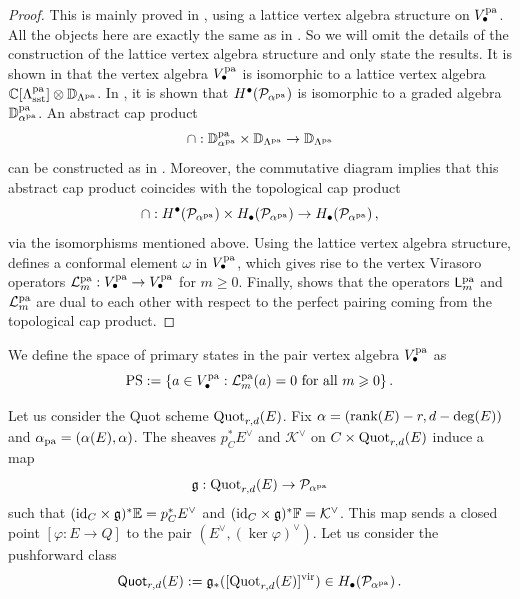 \documentclass[11pt]{amsart}
\theoremstyle{remark}
\newcommand{\C}{\mathbb{C}}
\renewcommand{\P}{\mathcal{P}}
\newcommand{\mf}[1]{\mathfrak{#1}}
\newcommand{\F}{\mathbb{F}}
\newcommand{\D}{\mathbb{D}}
\newcommand{\E}{\mathbb{E}}
\newcommand{\rk}{\textnormal{rank}}
\newcommand{\id}{\textup{id}}
\newcommand{\vp}[0]{\varphi}
\newcommand{\quot}[0]{\textnormal{Quot}}
\newcommand{\vir}[0]{\textnormal{vir}}
\newcommand{\pa}[0]{\textnormal{pa}}
\renewcommand{\L}[0]{\mathcal L}
\newcommand{\PS}{\textnormal{PS}}
\newcommand{\kv}{{\mathcal K^\vee}}
\newcommand{\mL}{\mathsf{L}}
\numberwithin{theorem}{section}
\begin{document}
\begin{proof}
This is mainly proved in \cite[Section 4.3]{BLM24},
using a lattice vertex algebra structure on $V_\bullet^\pa$.
All the objects here are exactly the same as in \cite[Section 4.3]{BLM24}.
So we will omit the details of the construction of the lattice vertex algebra structure and only state the results.
It is shown in \cite[Theorem 4.7]{BLM24} that the vertex algebra
$V^\pa_\bullet$ is isomorphic to a lattice vertex algebra
$\C[\Lambda^\pa_{\text{sst}}] \otimes \D_{\Lambda^\pa}$.
In \cite[Lemma 4.8]{BLM24}, it is shown that
$H^\bullet(\P_{\alpha^\pa})$ is isomorphic to a graded algebra $\D^{\pa}_{\alpha^\pa}$.
An abstract cap product 
$$ \cap : \D^\pa_{\alpha^\pa} \times \D_{\Lambda^\pa} \to \D_{\Lambda^\pa}$$
can be constructed as in \cite[Equation (40)]{BLM24}.
Moreover, the commutative diagram \cite[Diagram (41)]{BLM24}
implies that this abstract cap product coincides with the topological cap product 
$$ \cap : H^\bullet(\P_{\alpha^\pa}) \times H_\bullet(\P_{\alpha^\pa}) \to H_\bullet(\P_{\alpha^\pa})\,,$$
via the isomorphisms mentioned above.
Using the lattice vertex algebra structure, \cite[Section 4.3]{BLM24} defines a conformal element $\omega$ in $V^\pa_\bullet$,
which gives rise to the vertex Virasoro operators $\L_m^\pa : V^\pa_\bullet \to V^\pa _\bullet$ for $m \geqslant 0$.
Finally, \cite[Theorem 4.12]{BLM24} shows that the operators 
$\mL_m^\pa$ and $\L_m^\pa$ are dual to each other with respect to the perfect pairing coming from the topological cap product.
\end{proof}
We define the space of primary states in the pair vertex algebra
$V_\bullet^\pa$ as
$$ \PS := \{a \in V_\bullet^\pa : \L_m^\pa(a) = 0 \text{ for all } m \geqslant 0\}\,.$$

Let us consider the Quot scheme $\quot_{r,d}(E)$.
Fix $\alpha = (\rk(E)-r,d-\deg(E))$ and $\alpha_{\pa} = (\alpha(E),\alpha)$.
The sheaves $p_C^*E^\vee$ and $\kv$ on $C \times \quot_{r,d}(E)$ induce a map
$$\mf g : \quot_{r,d}(E) \to \P_{\alpha^\pa}$$
such that $(\id_C \times \mf g)^*\E = p_C^*E^\vee$ 
and $(\id_C \times \mf g)^*\F = \kv$.
This map sends a closed point $[\vp: E \to Q]$ to the pair $(E^\vee,(\ker\vp)^\vee)$.
Let us consider the pushforward class
$$\mathsf{Quot}_{r,d}(E) :={\mathfrak g}_*([\quot_{r,d}(E)]^\vir)  \in H_\bullet (\P_{\alpha^\pa})\,.$$
\end{document}
